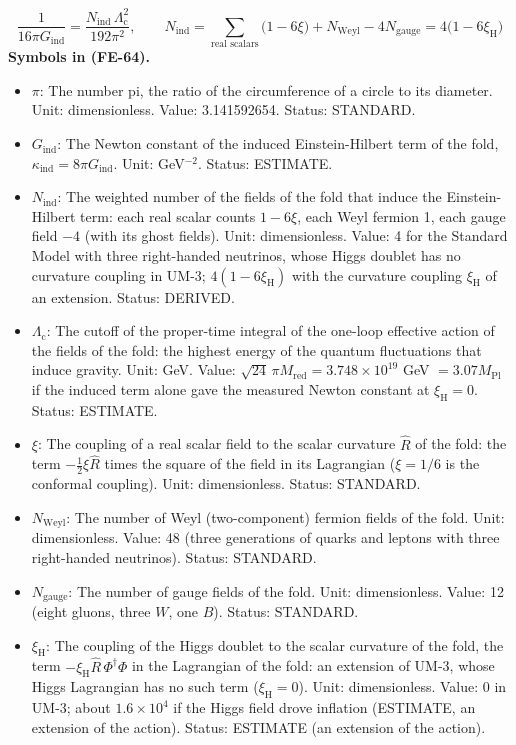 \documentclass[
  10pt,
]{article}
\providecommand{\tightlist}{%
  \setlength{\itemsep}{0pt}\setlength{\parskip}{0pt}}
\begin{document}
\[
\frac{1}{16\pi G_{\mathrm{ind}}} = \frac{N_{\mathrm{ind}}\,\Lambda_{\mathrm{c}}^2}{192\pi^2},\qquad
N_{\mathrm{ind}} = \sum_{\text{real scalars}}\big(1 - 6\xi\big) + N_{\mathrm{Weyl}} - 4N_{\mathrm{gauge}} = 4\big(1 - 6\xi_{\mathrm{H}}\big) \tag{FE-64}
\] \textbf{Symbols in (FE-64).}

\begin{itemize}
\tightlist
\item
  \(\pi\): The number pi, the ratio of the circumference of a circle to
  its diameter. Unit: dimensionless. Value: 3.141592654. Status:
  STANDARD.
\item
  \(G_{\mathrm{ind}}\): The Newton constant of the induced
  Einstein-Hilbert term of the fold,
  \(\kappa_{\mathrm{ind}} = 8\pi G_{\mathrm{ind}}\). Unit: GeV\(^{-2}\).
  Status: ESTIMATE.
\item
  \(N_{\mathrm{ind}}\): The weighted number of the fields of the fold
  that induce the Einstein-Hilbert term: each real scalar counts
  \(1 - 6\xi\), each Weyl fermion 1, each gauge field \(-4\) (with its
  ghost fields). Unit: dimensionless. Value: 4 for the Standard Model
  with three right-handed neutrinos, whose Higgs doublet has no
  curvature coupling in UM-3; \(4(1 - 6\xi_{\mathrm{H}})\) with the
  curvature coupling \(\xi_{\mathrm{H}}\) of an extension. Status:
  DERIVED.
\item
  \(\Lambda_{\mathrm{c}}\): The cutoff of the proper-time integral of
  the one-loop effective action of the fields of the fold: the highest
  energy of the quantum fluctuations that induce gravity. Unit: GeV.
  Value: \(\sqrt{24}\,\pi M_{\mathrm{red}} = 3.748\times10^{19}\) GeV
  \(= 3.07M_{\mathrm{Pl}}\) if the induced term alone gave the measured
  Newton constant at \(\xi_{\mathrm{H}} = 0\). Status: ESTIMATE.
\item
  \(\xi\): The coupling of a real scalar field to the scalar curvature
  \(\hat R\) of the fold: the term \(-\frac12\xi\hat R\) times the
  square of the field in its Lagrangian (\(\xi = 1/6\) is the conformal
  coupling). Unit: dimensionless. Status: STANDARD.
\item
  \(N_{\mathrm{Weyl}}\): The number of Weyl (two-component) fermion
  fields of the fold. Unit: dimensionless. Value: 48 (three generations
  of quarks and leptons with three right-handed neutrinos). Status:
  STANDARD.
\item
  \(N_{\mathrm{gauge}}\): The number of gauge fields of the fold. Unit:
  dimensionless. Value: 12 (eight gluons, three \(W\), one \(B\)).
  Status: STANDARD.
\item
  \(\xi_{\mathrm{H}}\): The coupling of the Higgs doublet to the scalar
  curvature of the fold, the term
  \(-\xi_{\mathrm{H}}\hat R\,\Phi^\dagger\Phi\) in the Lagrangian of the
  fold: an extension of UM-3, whose Higgs Lagrangian has no such term
  (\(\xi_{\mathrm{H}} = 0\)). Unit: dimensionless. Value: 0 in UM-3;
  about \(1.6\times10^4\) if the Higgs field drove inflation (ESTIMATE,
  an extension of the action). Status: ESTIMATE (an extension of the
  action).
\end{itemize}
\end{document}
